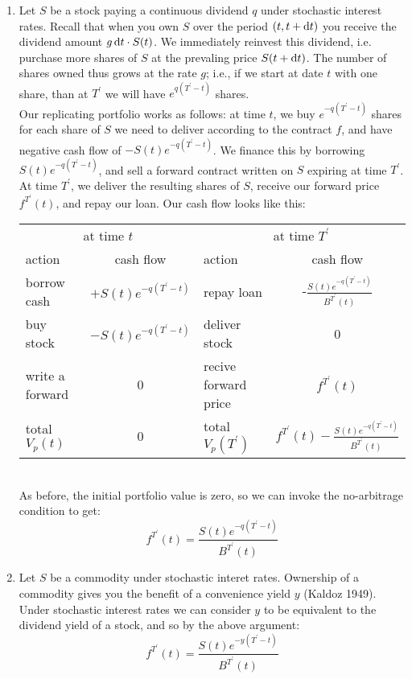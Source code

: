 \documentclass[11pt]{article}
\begin{document}
\begin{enumerate}
\item Let $S$ be a stock paying a continuous dividend $q$ under stochastic interest rates. Recall that when you own $S$ over the period $(t, t + \dif t)$ you receive the dividend amount $g \dif t \cdot S(t)$. We immediately reinvest this dividend, i.e. purchase more shares of $S$ at the prevaling price $S(t + \dif t)$. The number of shares owned thus grows at the rate $g$; i.e., if we start at date $t$ with one share, than at $T^\prime$ we will have $e^{q(T^\prime - t)}$ shares. \\

Our replicating portfolio works as follows: at time $t$, we buy $e^{-q(T^\prime - t)}$ shares for each share of $S$ we need to deliver according to the contract $f$, and have negative cash flow of $-S(t)e^{-q(T^\prime - t)}$. We finance this by borrowing $S(t)e^{-q(T^\prime - t)}$, and sell a forward contract written on $S$ expiring at time $T^\prime$. At time $T^\prime$, we deliver the resulting shares of $S$, receive our forward price $f^{T^\prime}(t)$, and repay our loan.  Our cash flow looks like this:

\begin{tabular}{l | c | l | c }
\multicolumn{2}{c|}{at time $t$} & \multicolumn{2}{c}{at time $T^\prime$} \\
action & cash flow & action & cash flow  \\
\hline
borrow cash & $+S(t)e^{-q(T^\prime - t)}$  & repay loan & -$\frac{S(t)e^{-q(T^\prime - t)}}{B^{T^\prime}(t)}$  \\
buy stock & $-S(t)e^{-q(T^\prime - t)}$ & deliver stock & 0\\
write a forward & 0 & recive forward price & $f^{T^\prime}(t)$ \\
\hline
total $V_p(t)$ & 0 & total $V_p(T^\prime)$ & $f^{T^\prime}(t) - \frac{S(t)e^{-q(T^\prime - t)}}{B^{T^\prime}(t)}$ \\
\end{tabular}\\

As before, the initial portfolio value is zero, so we can invoke the no-arbitrage condition to get:
$$f^{T^\prime}(t) = \frac{S(t)e^{-q(T^\prime - t)}}{B^{T^\prime}(t)}$$

\item Let $S$ be a commodity under stochastic interet rates. Ownership of a commodity gives you the benefit of a convenience yield $y$ (Kaldoz 1949). Under stochastic interest rates we can consider $y$ to be equivalent to the dividend yield of a stock, and so by the above argument:
$$f^{T^\prime}(t) = \frac{S(t)e^{-y(T^\prime - t)}}{B^{T^\prime}(t)}$$


\end{enumerate}
\end{document}
